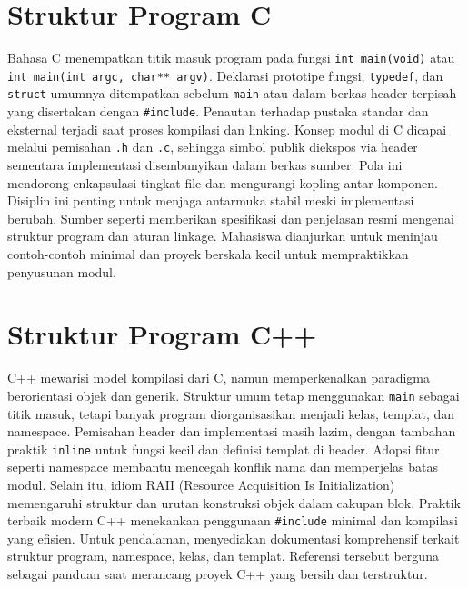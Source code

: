 \documentclass[../main.tex]{subfiles}
\begin{document}
\section{Struktur Program C}
Bahasa C menempatkan titik masuk program pada fungsi \texttt{int main(void)} atau \texttt{int main(int argc, char** argv)}. Deklarasi prototipe fungsi, \texttt{typedef}, dan \texttt{struct} umumnya ditempatkan sebelum \texttt{main} atau dalam berkas header terpisah yang disertakan dengan \texttt{#include}. Penautan terhadap pustaka standar dan eksternal terjadi saat proses kompilasi dan linking.
Konsep modul di C dicapai melalui pemisahan \texttt{.h} dan \texttt{.c}, sehingga simbol publik diekspos via header sementara implementasi disembunyikan dalam berkas sumber. Pola ini mendorong enkapsulasi tingkat file dan mengurangi kopling antar komponen. Disiplin ini penting untuk menjaga antarmuka stabil meski implementasi berubah.
Sumber seperti \textcite{gnu-c-manual,iso-c-draft-n1570} memberikan spesifikasi dan penjelasan resmi mengenai struktur program dan aturan linkage. Mahasiswa dianjurkan untuk meninjau contoh-contoh minimal dan proyek berskala kecil untuk mempraktikkan penyusunan modul.

\section{Struktur Program C++}
C++ mewarisi model kompilasi dari C, namun memperkenalkan paradigma berorientasi objek dan generik. Struktur umum tetap menggunakan \texttt{main} sebagai titik masuk, tetapi banyak program diorganisasikan menjadi kelas, templat, dan namespace. Pemisahan header dan implementasi masih lazim, dengan tambahan praktik \texttt{inline} untuk fungsi kecil dan definisi templat di header.
Adopsi fitur seperti namespace membantu mencegah konflik nama dan memperjelas batas modul. Selain itu, idiom RAII (Resource Acquisition Is Initialization) memengaruhi struktur dan urutan konstruksi objek dalam cakupan blok. Praktik terbaik modern C++ menekankan penggunaan \texttt{#include} minimal dan kompilasi yang efisien.
Untuk pendalaman, \textcite{cpp-reference} menyediakan dokumentasi komprehensif terkait struktur program, namespace, kelas, dan templat. Referensi tersebut berguna sebagai panduan saat merancang proyek C++ yang bersih dan terstruktur.
\end{document}
